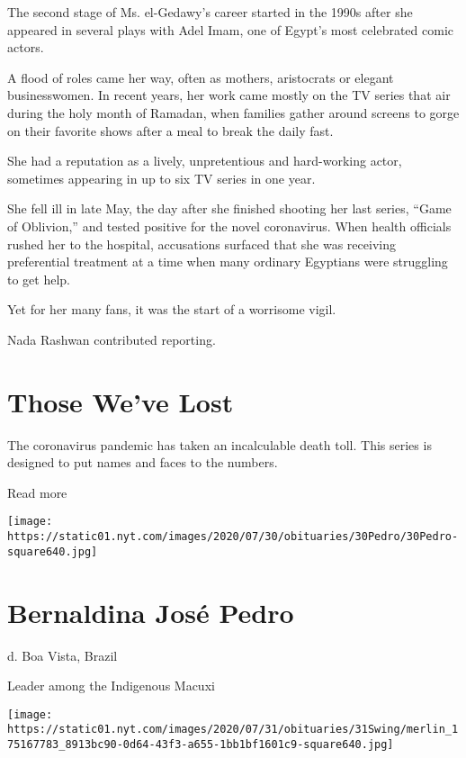 The second stage of Ms. el-Gedawy's career started in the 1990s after
she appeared in several plays with Adel Imam, one of Egypt's most
celebrated comic actors.

A flood of roles came her way, often as mothers, aristocrats or elegant
businesswomen. In recent years, her work came mostly on the TV series
that air during the holy month of Ramadan, when families gather around
screens to gorge on their favorite shows after a meal to break the daily
fast.

She had a reputation as a lively, unpretentious and hard-working actor,
sometimes appearing in up to six TV series in one year.

She fell ill in late May, the day after she finished shooting her last
series, ``Game of Oblivion,'' and tested positive for the novel
coronavirus. When health officials rushed her to the hospital,
accusations surfaced that she was receiving preferential treatment at a
time when many ordinary Egyptians were struggling to get help.

Yet for her many fans, it was the start of a worrisome vigil.

Nada Rashwan contributed reporting.

\href{https://www.nytimes.com/interactive/2020/obituaries/people-died-coronavirus-obituaries.html?action=click\&pgtype=Article\&state=default\&region=BELOW_MAIN_CONTENT\&context=covid_obits_promo}{}

\hypertarget{those-weve-lost}{%
\section{Those We've Lost}\label{those-weve-lost}}

The coronavirus pandemic has taken an incalculable death toll. This
series is designed to put names and faces to the numbers.

Read more

\texttt{[image: https://static01.nyt.com/images/2020/07/30/obituaries/30Pedro/30Pedro-square640.jpg]}

\hypertarget{bernaldina-josuxe9-pedro}{%
\section{Bernaldina José Pedro}\label{bernaldina-josuxe9-pedro}}

d. Boa Vista, Brazil

Leader among the Indigenous Macuxi

\texttt{[image: https://static01.nyt.com/images/2020/07/31/obituaries/31Swing/merlin\_175167783\_8913bc90-0d64-43f3-a655-1bb1bf1601c9-square640.jpg]}

